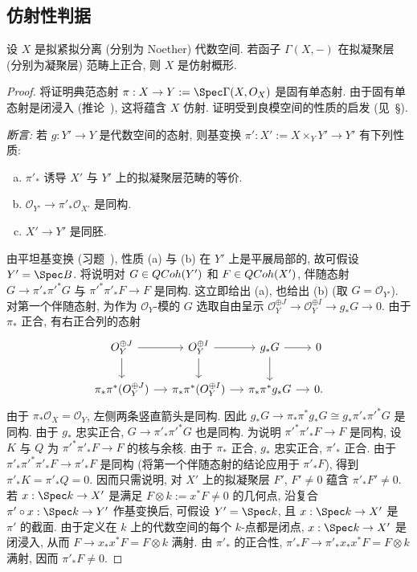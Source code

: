 \subsection{仿射性判据}\label{src:5.5.4-subsection}
\begin{theorem}\label{src:5.5.16}
设 $X$ 是拟紧拟分离 (分别为 Noether) 代数空间. 若函子 $\Gamma(X,-)$ 在拟凝聚层 (分别为凝聚层) 范畴上正合, 则 $X$ 是仿射概形.
\end{theorem}
\begin{proof}
将证明典范态射 $\pi:X\to Y:=\Spec\Gamma(X,\mathcal O_X)$ 是固有单态射. 由于固有单态射是闭浸入 (推论~), 这将蕴含 $X$ 仿射. 证明受到良模空间的性质的启发 (见~\S{}).

\textit{断言:} 若 $g:Y'\to Y$ 是代数空间的态射, 则基变换 $\pi':X':=X\times_Y Y'\to Y'$ 有下列性质:
\begin{enumerate}[(a)]
\item $\pi'_*$ 诱导 $X'$ 与 $Y'$ 上的拟凝聚层范畴的等价.
\item $\mathcal O_{Y'}\to\pi'_*\mathcal O_{X'}$ 是同构.
\item $X'\to Y'$ 是同胚.
\end{enumerate}
由平坦基变换 (习题~), 性质 (a) 与 (b) 在 $Y'$ 上是平展局部的, 故可假设 $Y'=\Spec B$. 将说明对 $G\in QCoh(Y')$ 和 $F\in QCoh(X')$, 伴随态射 $G\to\pi'_*\pi'^*G$ 与 $\pi'^*\pi'_*F\to F$ 是同构. 这立即给出 (a), 也给出 (b) (取 $G=\mathcal O_{Y'}$). 对第一个伴随态射, 为作为 $\mathcal O_Y$-模的 $G$ 选取自由呈示 $\mathcal O_Y^{\oplus J}\to\mathcal O_Y^{\oplus I}\to g_*G\to0$. 由于 $\pi_*$ 正合, 有右正合列的态射
\[
\begin{tikzcd}[column sep=small]
\mathcal O_Y^{\oplus J}\arrow[r]\arrow[d]&\mathcal O_Y^{\oplus I}\arrow[r]\arrow[d]&g_*G\arrow[r]\arrow[d]&0\\
\pi_*\pi^*(\mathcal O_Y^{\oplus J})\arrow[r]&\pi_*\pi^*(\mathcal O_Y^{\oplus I})\arrow[r]&\pi_*\pi^*g_*G\arrow[r]&0.
\end{tikzcd}
\]
由于 $\pi_*\mathcal O_X=\mathcal O_Y$, 左侧两条竖直箭头是同构. 因此 $g_*G\to\pi_*\pi^*g_*G\cong g_*\pi'_*\pi'^*G$ 是同构. 由于 $g_*$ 忠实正合, $G\to\pi'_*\pi'^*G$ 也是同构. 为说明 $\pi'^*\pi'_*F\to F$ 是同构, 设 $K$ 与 $Q$ 为 $\pi'^*\pi'_*F\to F$ 的核与余核. 由于 $\pi_*$ 正合, $g_*$ 忠实正合, $\pi'_*$ 正合. 由于 $\pi'_*\pi'^*\pi'_*F\to\pi'_*F$ 是同构 (将第一个伴随态射的结论应用于 $\pi'_*F$), 得到 $\pi'_*K=\pi'_*Q=0$. 因而只需说明, 对 $X'$ 上的拟凝聚层 $F'$, $F'\neq0$ 蕴含 $\pi'_*F'\neq0$. 若 $x:\Spec k\to X'$ 是满足 $F\otimes k:=x^*F\neq0$ 的几何点, 沿复合 $\pi'\circ x:\Spec k\to Y'$ 作基变换后, 可假设 $Y'=\Spec k$, 且 $x:\Spec k\to X'$ 是 $\pi'$ 的截面. 由于定义在 $k$ 上的代数空间的每个 $k$-点都是闭点, $x:\Spec k\to X'$ 是闭浸入, 从而 $F\to x_*x^*F=F\otimes k$ 满射. 由 $\pi'_*$ 的正合性, $\pi'_*F\to\pi'_*x_*x^*F=F\otimes k$ 满射, 因而 $\pi'_*F\neq0$.


\end{proof}
